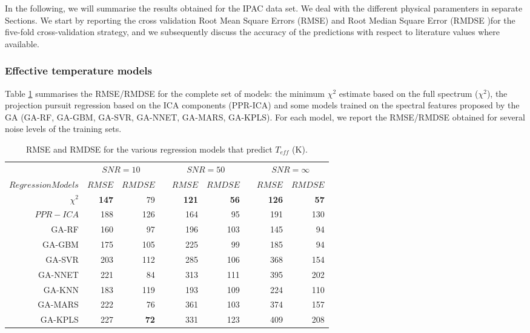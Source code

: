 
In the following, we will summarise the results obtained for the IPAC
data set. We deal with the different physical paramenters in separate
Sections. We start by reporting the cross validation Root Mean Square
Errors (RMSE) and Root Median Square Error (RMDSE )for the five-fold
cross-validation strategy, and we subsequently discuss the accuracy of
the predictions with respect to literature values where available.

\subsubsection{Effective temperature models}

Table \ref{tab:model_TSD_IPAC} summarises the RMSE/RMDSE for the
complete set of models: the minimum $\chi^2$ estimate based on the
full spectrum ($\chi^2$), the projection pursuit regression based on
the ICA components (PPR-ICA) and some models trained on the spectral
features proposed by the GA (GA-RF, GA-GBM, GA-SVR, GA-NNET, GA-MARS,
GA-KPLS). For each model, we report the RMSE/RMDSE obtained for
several noise levels of the training sets.

\begin{table}\centering
{}
\begin{tabular}{@{}rrrcrrcrr@{}}\toprule
& \multicolumn{2}{c}{$SNR = 10$} & \phantom{ab}& \multicolumn{2}{c}{$SNR = 50$} &
\phantom{ab} & \multicolumn{2}{c}{$SNR = \infty$}\\
\cmidrule{2-3} \cmidrule{5-6} \cmidrule{8-9}
$Regression Models$ & $RMSE$ & $RMDSE$ && $RMSE$ & $RMDSE$ && $RMSE$ & $RMDSE$ \\ \midrule
$\chi^2$    & {\bf 147} & 79       && {\bf 121} & {\bf 56}  && {\bf 126} & {\bf 57} \\
$ PPR-ICA$  & 188       & 126      && 164       & 95        && 191       & 130 \\
GA-RF       & 160       & 97       && 196       & 103       && 145       & 94 \\
GA-GBM      & 175       & 105      && 225       & 99        && 185       & 94 \\
GA-SVR      & 203       & 112      && 285       & 106       && 368       & 154 \\
GA-NNET     & 221       & 84       && 313       & 111       && 395       & 202 \\
GA-KNN      & 183       & 119      && 193       & 109       && 224       & 110  \\
GA-MARS     & 222       & 76       && 361       & 103       && 374       & 157 \\
GA-KPLS     & 227       & {\bf 72} && 331       & 123       && 409       & 208 \\
\bottomrule
\end{tabular}
\caption {RMSE and RMDSE for the various regression models that predict $T_{eff}$ (K).} 
\label{tab:model_TSD_IPAC} 
\end{table}

